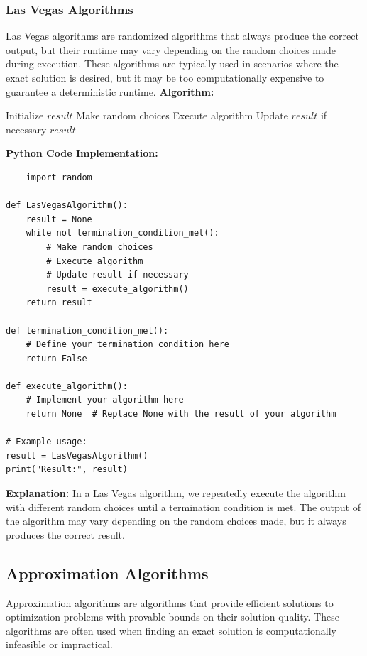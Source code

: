\documentclass[12pt]{book} %
\begin{document}
\subsubsection{Las Vegas Algorithms}
Las Vegas algorithms are randomized algorithms that always produce the correct output, but their runtime may vary depending on the random choices made during execution. These algorithms are typically used in scenarios where the exact solution is desired, but it may be too computationally expensive to guarantee a deterministic runtime.
\FloatBarrier
\textbf{Algorithm:}
\begin{algorithm}
\caption{Las Vegas Algorithm}
\begin{algorithmic}[1]
\State Initialize $result$
    \State Make random choices
    \State Execute algorithm
    \State Update $result$ if necessary
\EndWhile
\Return $result$
\end{algorithmic}
\end{algorithm}
\FloatBarrier
\textbf{Python Code Implementation:}
\FloatBarrier
\begin{lstlisting}
    import random

def LasVegasAlgorithm():
    result = None
    while not termination_condition_met():
        # Make random choices
        # Execute algorithm
        # Update result if necessary
        result = execute_algorithm()
    return result

def termination_condition_met():
    # Define your termination condition here
    return False

def execute_algorithm():
    # Implement your algorithm here
    return None  # Replace None with the result of your algorithm

# Example usage:
result = LasVegasAlgorithm()
print("Result:", result)
\end{lstlisting}
\FloatBarrier
\textbf{Explanation:} In a Las Vegas algorithm, we repeatedly execute the algorithm with different random choices until a termination condition is met. The output of the algorithm may vary depending on the random choices made, but it always produces the correct result.

\subsection{Approximation Algorithms}
Approximation algorithms are algorithms that provide efficient solutions to optimization problems with provable bounds on their solution quality. These algorithms are often used when finding an exact solution is computationally infeasible or impractical.
\end{document}
